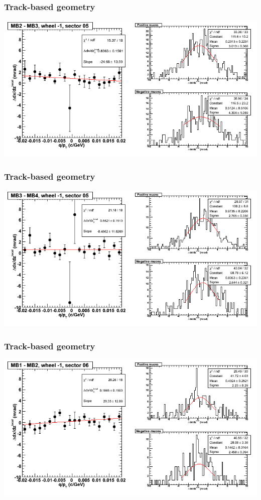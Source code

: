 \documentclass[compress]{beamer}
\begin{document}
\begin{frame}
\frametitle{Track-based geometry}
\includegraphics[width=\linewidth]{NOV4_segdiffs/dt13_slope_B_05_23.png}
\end{frame}

\begin{frame}
\frametitle{Track-based geometry}
\includegraphics[width=\linewidth]{NOV4_segdiffs/dt13_slope_B_05_34.png}
\end{frame}

\begin{frame}
\frametitle{Track-based geometry}
\includegraphics[width=\linewidth]{NOV4_segdiffs/dt13_slope_B_06_12.png}
\end{frame}
\end{document}
